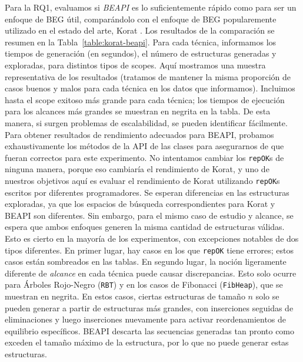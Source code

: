 Para la RQ1, evaluamos si \emph{BEAPI} es lo suficientemente rápido como para ser un enfoque de BEG útil, comparándolo con el enfoque de BEG popularemente utilizado en el estado del arte, \textsf{Korat} \cite{Siddiqui09}. Los resultados de la comparación se resumen en la Tabla~\ref{table:korat-beapi}. Para cada técnica, informamos los tiempos de generación (en segundos), el número de estructuras generadas y exploradas, para distintos tipos de scopes. 
Aquí mostramos una muestra representativa de los resultados (tratamos de mantener la misma proporción de casos buenos y malos para cada técnica en los datos que informamos). 
Incluimos hasta el scope exitoso más grande para cada técnica; los tiempos de ejecución para los alcances más grandes se muestran en negrita en la tabla. De esta manera, si surgen problemas de escalabilidad, se pueden identificar fácilmente. Para obtener resultados de rendimiento adecuados para \textsf{BEAPI}, probamos exhaustivamente los métodos de la API de las clases para asegurarnos de que fueran correctos para este experimento. No intentamos cambiar los \texttt{repOK}s de ninguna manera, porque eso cambiaría el rendimiento de \textsf{Korat}, y uno de nuestros objetivos aquí es evaluar el rendimiento de \textsf{Korat} utilizando \texttt{repOK}s escritos por diferentes programadores. Se esperan diferencias en las estructuras exploradas, ya que los espacios de búsqueda correspondientes para \textsf{Korat} y \textsf{BEAPI} son diferentes. Sin embargo, para el mismo caso de estudio y alcance, se espera que ambos enfoques generen la misma cantidad de estructuras válidas. Esto es cierto en la mayoría de los experimentos, con excepciones notables de dos tipos diferentes. En primer lugar, hay casos en los que \texttt{repOK} tiene errores; estos casos están sombreados en las tablas. En segundo lugar, la noción ligeramente diferente de \emph{alcance} en cada técnica puede causar discrepancias. Esto solo ocurre para Árboles Rojo-Negro (\texttt{RBT}) y en los casos de Fibonacci (\texttt{FibHeap}), que se muestran en negrita. En estos casos, ciertas estructuras de tamaño $n$ solo se pueden generar a partir de estructuras más grandes, con inserciones seguidas de eliminaciones y luego inserciones nuevamente para activar reordenamientos de equilibrio específicos. \textsf{BEAPI} descarta las secuencias generadas tan pronto como exceden el tamaño máximo de la estructura, por lo que no puede generar estas estructuras.

